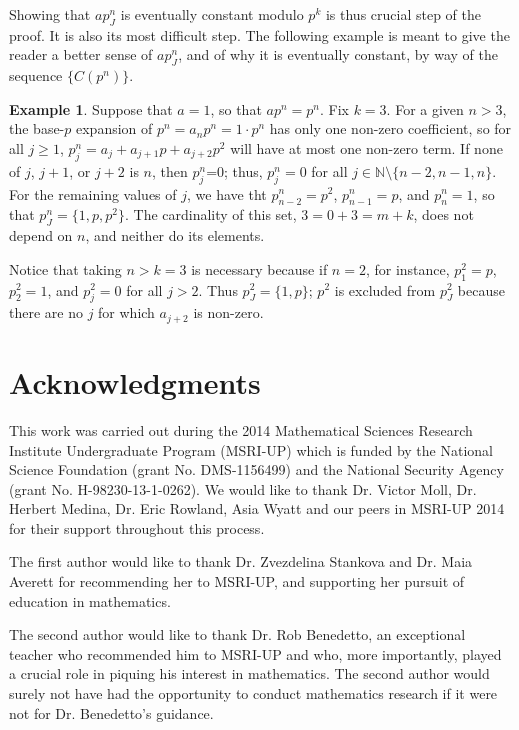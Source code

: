 \documentclass[12pt, letter]{article}    %
\theoremstyle{plain}
\theoremstyle{definition}
\newtheorem{example}[theorem]{Example}
\numberwithin{equation}{section}
\begin{document}
Showing that $ap^n_J$ is eventually constant modulo $p^k$ is thus crucial step of the proof. It is also its most difficult step. The following example is meant to give the reader a better sense of $ap^n_J$, and of why it is eventually constant, by way of the sequence $\{C(p^n)\}$.

\begin{example} Suppose that $a=1$, so that $ap^n=p^n$. Fix $k=3$. For a given $n>3$, the base-$p$ expansion of $p^n=a_np^n=1\cdot p^n$ has only one non-zero coefficient, so for all $j\geq 1$, $p^n_j=a_j+a_{j+1}p+a_{j+2}p^2$ will have at most one non-zero term. If none of $j$, $j+1$, or $j+2$ is $n$, then $p^n_j$=0; thus, $p^n_j=0$ for all $j\in\mathbb{N}\setminus\{n-2,n-1,n\}$. For the remaining values of $j$, we have tht $p^n_{n-2}=p^2$, $p^n_{n-1}=p$, and $p^n_n=1$, so that $p^n_J=\{1,p,p^2\}$. The cardinality of this set, $3=0+3=m+k$, does not depend on $n$, and neither do its elements.

Notice that taking $n>k=3$ is necessary because if $n=2$, for instance, $p^2_1=p$, $p^2_2=1$, and $p^2_j=0$ for all  $j>2$. Thus $p^2_J=\{1,p\}$; $p^2$ is excluded from $p^2_J$ because there are no $j$ for which $a_{j+2}$ is non-zero.
\end{example}

\section{Acknowledgments}
This work was carried out during the 2014 Mathematical Sciences Research Institute Undergraduate
Program (MSRI-UP) which is funded by the National Science Foundation 
(grant No. DMS-1156499) and the National Security Agency (grant No. H-98230-13-1-0262). 
We would like to thank Dr. Victor Moll, Dr. Herbert Medina, Dr. Eric Rowland, Asia Wyatt and our peers in MSRI-UP 2014 for their support throughout this process. 

The first author would like to thank Dr. Zvezdelina Stankova and Dr. Maia Averett for recommending her to MSRI-UP, and supporting her pursuit of education in mathematics.

The second author would like to thank Dr. Rob Benedetto, an exceptional teacher who recommended him to MSRI-UP and who, more importantly, played a crucial role in piquing his interest in mathematics. The second author would surely not have had the opportunity to conduct mathematics research if it were not for Dr. Benedetto's guidance.
\end{document}
